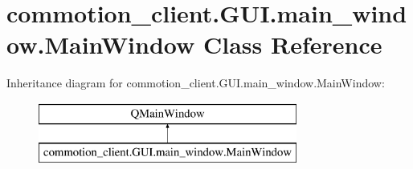 \hypertarget{classcommotion__client_1_1GUI_1_1main__window_1_1MainWindow}{\section{commotion\-\_\-client.\-G\-U\-I.\-main\-\_\-window.\-Main\-Window Class Reference}
\label{classcommotion__client_1_1GUI_1_1main__window_1_1MainWindow}
}
Inheritance diagram for commotion\-\_\-client.\-G\-U\-I.\-main\-\_\-window.\-Main\-Window\-:\begin{figure}[H]
\begin{center}
\leavevmode
\includegraphics[height=2.000000cm]{classcommotion__client_1_1GUI_1_1main__window_1_1MainWindow}
\end{center}
\end{figure}
